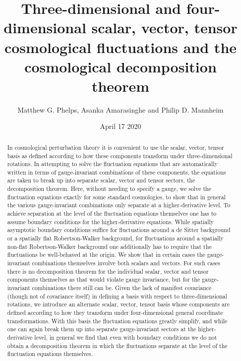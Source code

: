 \documentclass[aps,onecolumn,10pt]{revtex4}
\numberwithin{equation}{section}
\numberwithin{equation}{section}
\begin{document}
\allowdisplaybreaks
\setcounter{equation}{0}

 
\title{Three-dimensional and four-dimensional scalar, vector, tensor cosmological fluctuations and the cosmological decomposition theorem}

\author{Matthew G. Phelps, Asanka Amarasinghe  and Philip D. Mannheim}

\date{April 17 2020}

\begin{abstract}


In cosmological perturbation theory it is convenient to use the scalar, vector, tensor  basis as defined according to how these components transform under three-dimensional rotations. In attempting to solve the fluctuation equations that are automatically written in terms of gauge-invariant combinations of these components, the equations are taken to break up into separate scalar, vector and tensor sectors, the decomposition theorem. Here, without needing to specify a gauge, we solve the fluctuation equations exactly for some standard cosmologies, to show that in general the various gauge-invariant combinations only separate at a higher-derivative level. To achieve separation at the level of the fluctuation equations themselves one has to assume boundary conditions for the higher-derivative equations. While spatially asymptotic boundary conditions suffice for fluctuations around a de Sitter background or a spatially flat Robertson-Walker background, for fluctuations around a spatially non-flat Robertson-Walker background one additionally has to require that the fluctuations be well-behaved at the origin. We show that in certain cases the gauge-invariant combinations themselves involve both scalars and vectors. For such cases there is no decomposition theorem for the individual scalar, vector and tensor components  themselves as that would violate gauge invariance, but for the gauge-invariant combinations there still can be. Given the lack of manifest covariance (though not of covariance itself) in defining a basis with respect to three-dimensional rotations, we introduce an alternate scalar, vector, tensor basis whose components are defined according to how they transform under four-dimensional general coordinate transformations. With this basis the fluctuation equations greatly simplify, and while one can again break them up into separate gauge-invariant sectors at the higher-derivative level, in general we find that even with boundary conditions we do not obtain a decomposition theorem in which the fluctuations separate at the level of the fluctuation equations themselves. 



\end{abstract}
\end{document}
